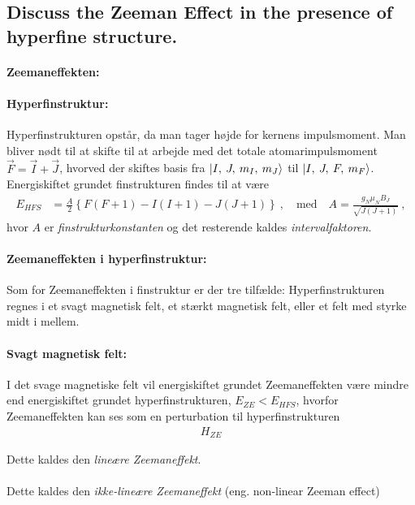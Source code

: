 \subsection{Discuss the Zeeman Effect in the presence of hyperfine structure.}


\paragraph{Zeemaneffekten:}


\paragraph{Hyperfinstruktur:} Hyperfinstrukturen opstår, da man tager højde for kernens impulsmoment. Man bliver nødt til at skifte til at arbejde med det totale atomarimpulsmoment $\Vec{F} = \Vec{I} + \Vec{J}$, hvorved der skiftes basis fra $\ket{I,\: J,\: m_I,\: m_J}$ til $\ket{I,\: J,\: F,\: m_F}$. Energiskiftet grundet finstrukturen findes til at være
\begin{align}
    E_{HFS} &= \frac{A}{2}\left\{F(F+1) - I(I+1) - J(J+1)\right\} \: , \quad \text{med} \quad A = \frac{g_N \mu_N B_J}{\sqrt{J(J+1)}} \: ,
\end{align}
hvor $A$ er \emph{finstrukturkonstanten} og det resterende kaldes \emph{intervalfaktoren}.


\paragraph{Zeemaneffekten i hyperfinstruktur:} Som for Zeemaneffekten i finstruktur er der tre tilfælde: Hyperfinstrukturen regnes i et svagt magnetisk felt, et stærkt magnetisk felt, eller et felt med styrke midt i mellem.

\paragraph{Svagt magnetisk felt:} I det svage magnetiske felt vil energiskiftet grundet Zeemaneffekten være mindre end energiskiftet grundet hyperfinstrukturen, $E_{ZE} < E_{HFS}$, hvorfor Zeemaneffekten kan ses som en perturbation til hyperfinstrukturen
\begin{align}
    H_{ZE}
\end{align}

Dette kaldes den \emph{lineære Zeemaneffekt}.


\paragraph{}

Dette kaldes den \emph{ikke-lineære Zeemaneffekt} (eng. non-linear Zeeman effect)